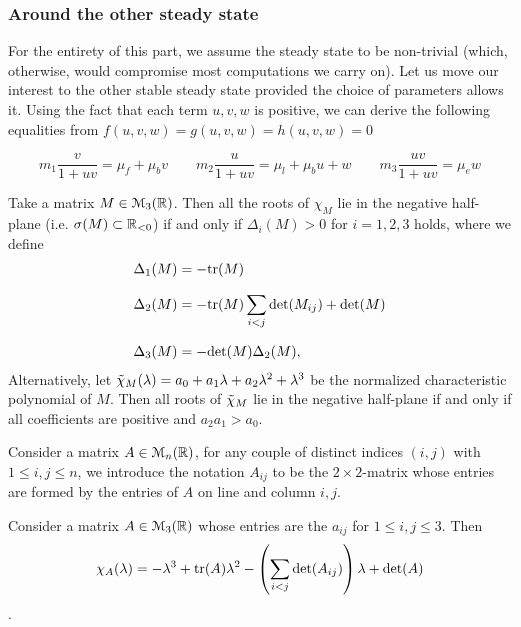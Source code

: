 \subsubsection{Around the other steady state}

For the entirety of this part, we assume the steady state to be non-trivial (which, otherwise, would compromise most computations we carry on). Let us move our interest to the other stable steady state provided the choice of parameters allows it. Using the fact that each term $u, v, w$ is positive, we can derive the following equalities from $f(u, v, w) = g(u, v, w) = h(u, v, w) = 0$

\begin{equation}
	\label{new_identities}
		m_1 \dfrac{v}{1 + u v} = \mu_f +  \mu_b v \quad \quad
		m_2 \dfrac{u}{1 + u v}  = \mu_l +  \mu_b u + w \quad \quad
		m_3 \dfrac{ u v}{1 + uv} = \mu_e w
\end{equation}


\begin{theorem}
	Take a matrix $M \in \EuScript{M}_3(\mathbb{R})$. Then all the roots of $\chi_M$ lie in the negative half-plane (i.e. $\sigma(M) \subset \mathbb{R}_{<0}$) if and only if
	$\Delta_i(M) > 0$ for $i=1, 2, 3$ holds, where we define
	\begin{align*}
		\Delta_1(M) &= -\mathrm{tr}(M) \\[0.7em]
		\Delta_2(M) &= -\mathrm{tr}(M) \sum_{i < j} \mathrm{det}(M_{ij}) + \mathrm{det}(M) \\[0.7em]
		\Delta_3(M) &= -\mathrm{det}(M) \Delta_2(M),
	\end{align*}
Alternatively, let $\Tilde{\chi}_{M}(\lambda) = a_0 + a_1 \lambda + a_2 \lambda^2 + \lambda^3$ be the normalized characteristic polynomial of $M$. Then all roots of $\Tilde{\chi}_M$ lie in the negative half-plane if and only if all coefficients are positive and $a_2 a_1 > a_0$.
\end{theorem}


\begin{definition}
	Consider a matrix $A \in \EuScript{M}_n(\mathbb{R})$, for any couple of distinct indices $(i, j)$ with $1 \le i, j \le n$, we introduce the notation $A_{ij}$ to be the $2 \! \times \! 2$-matrix whose entries are formed by the entries of $A$ on line and column $i, j$.
\end{definition}


\begin{proposition} Consider a matrix $A \in \EuScript{M}_3(\mathbb{R})$ whose entries are the $a_{ij}$ for $1 \le i, j \le 3$. Then 
	$$\chi_A(\lambda) = -\lambda^3 + \mathrm{tr}(A) \lambda^2 - \left( \sum_{i < j} \mathrm{det}(A_{ij})\right) \lambda + \mathrm{det}(A)$$.
\end{proposition}


